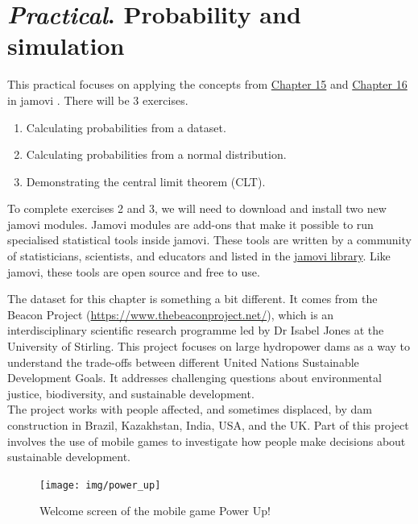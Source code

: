 \documentclass[
]{scrbook}
\providecommand{\tightlist}{%
  \setlength{\itemsep}{0pt}\setlength{\parskip}{0pt}}
\begin{document}
\hypertarget{Chapter_17}{%
\chapter{\texorpdfstring{\emph{Practical}. Probability and simulation}{Practical. Probability and simulation}}\label{Chapter_17}}

This practical focuses on applying the concepts from \protect\hyperlink{Chapter_15}{Chapter 15} and \protect\hyperlink{Chapter_16}{Chapter 16} in jamovi \citep{Jamovi2022}.
There will be 3 exercises.

\begin{enumerate}
\def\labelenumi{\arabic{enumi}.}
\tightlist
\item
  Calculating probabilities from a dataset.
\item
  Calculating probabilities from a normal distribution.
\item
  Demonstrating the central limit theorem (CLT).
\end{enumerate}

To complete exercises 2 and 3, we will need to download and install two new jamovi modules.
Jamovi modules are add-ons that make it possible to run specialised statistical tools inside jamovi.
These tools are written by a community of statisticians, scientists, and educators and listed in the \href{https://www.jamovi.org/library.html}{jamovi library}.
Like jamovi, these tools are open source and free to use.

The dataset for this chapter is something a bit different.
It comes from the Beacon Project (\url{https://www.thebeaconproject.net/}), which is an interdisciplinary scientific research programme led by Dr Isabel Jones at the University of Stirling.
This project focuses on large hydropower dams as a way to understand the trade-offs between different United Nations Sustainable Development Goals.
It addresses challenging questions about environmental justice, biodiversity, and sustainable development.\\
The project works with people affected, and sometimes displaced, by dam construction in Brazil, Kazakhstan, India, USA, and the UK.
Part of this project involves the use of mobile games to investigate how people make decisions about sustainable development.

\begin{figure}
\texttt{[image: img/power\_up]} \caption{Welcome screen of the mobile game Power Up!}\label{fig:unnamed-chunk-70}
\end{figure}
\end{document}
